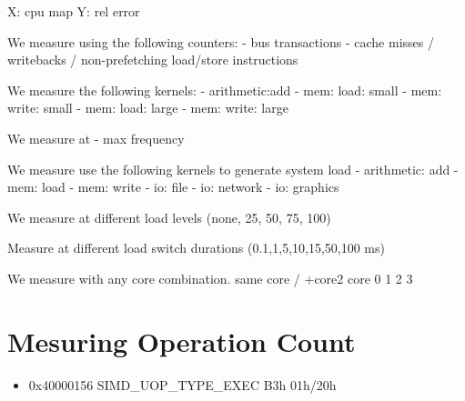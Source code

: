 \documentclass[a4paper,12pt]{article}
\begin{document}
X: cpu map Y: rel error

We measure using the following counters:
- bus transactions
- cache misses / writebacks / non-prefetching load/store instructions

We measure the following kernels:
- arithmetic:add
- mem: load: small 
- mem: write: small
- mem: load: large
- mem: write: large

We measure at 
- max frequency

We measure use the following kernels to generate system load
- arithmetic: add
- mem: load
- mem: write
- io: file 
- io: network
- io: graphics

We measure at different load levels (none, 25, 50, 75, 100)

Measure at different load switch durations (0.1,1,5,10,15,50,100 ms)

We measure with any core combination.
same core / +core2
core 0 1 2 3

\section{Mesuring Operation Count}
\begin{itemize}
\item 0x40000156   SIMD\_UOP\_TYPE\_EXEC B3h 01h/20h
\end{itemize}




\listoffigures



\end{document}
